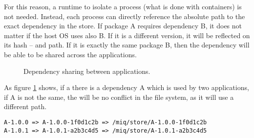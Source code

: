 For this reason, a runtime to isolate a process (what is
done with containers) is not needed. Instead, each process
can directly reference the absolute path to the exact
dependency in the store. If package A requires dependency B,
it does not matter if the host \ac{OS} uses also B. If it is
a different version, it will be reflected on its hash -- and
path. If it is exactly the same package B, then the
dependency will be able to be shared across the applications.

\begin{figure}[hbtp]
    \centerfloat
    
    \caption{Dependency sharing between applications.}
    \label{fig:dep_share}
\end{figure}

As figure \ref{fig:dep_share} shows, if a there is a
dependency A which is used by two applications, if A is not
the same, the will be no conflict in the file system, as it
will use a different path.

\begin{verbatim}
A-1.0.0 => A-1.0.0-1f0d1c2b => /miq/store/A-1.0.0-1f0d1c2b
A-1.0.1 => A-1.0.1-a2b3c4d5 => /miq/store/A-1.0.1-a2b3c4d5
\end{verbatim}
